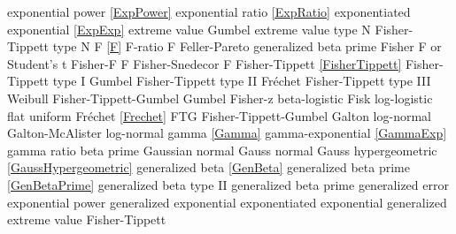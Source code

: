 exponential power				\dotfill	\eqref{ExpPower}					\ncite
exponential ratio				\dotfill	\eqref{ExpRatio}					\ncite	%
exponentiated exponential			\dotfill	\eqref{ExpExp}						\ncite	%
extreme value					\dotfill	Gumbel 							\ncite
extreme value type N 			\dotfill	Fisher-Tippett type N 				\ncite	%
%
F							\dotfill	\eqref{F} 							\ncite	%
F-ratio						\dotfill	F								\ncite	%
Feller-Pareto					\dotfill	generalized beta prime 				\ncite	%
Fisher						\dotfill	F or Student's t 					\ncite	%
Fisher-F 						\dotfill	F 								\ncite	%
Fisher-Snedecor 				\dotfill	F 								\ncite	%
Fisher-Tippett					\dotfill	\eqref{FisherTippett} 					\ncite	%
Fisher-Tippett type I				\dotfill	Gumbel 							\ncite	%
Fisher-Tippett type II				\dotfill	Fr\'{e}chet  						\ncite	%
Fisher-Tippett type III			\dotfill	Weibull 							\ncite	%
Fisher-Tippett-Gumbel			\dotfill	Gumbel  							\ncite	%
Fisher-z						\dotfill	beta-logistic						\ncite	%
Fisk							\dotfill	log-logistic						\ncite 	%
flat 							\dotfill	uniform 							\ncite	%
Fr\'{e}chet 					\dotfill	\eqref{Frechet} 						\ncite	%
FTG							\dotfill	Fisher-Tippett-Gumbel 				\ncite	%
%
Galton						\dotfill	log-normal 						\ncite	%
Galton-McAlister				\dotfill	log-normal 						\ncite	%
gamma						\dotfill	\eqref{Gamma} 					\ncite	%
gamma-exponential				\dotfill	\eqref{GammaExp}					\ncite	%
gamma ratio					\dotfill	beta prime						\ncite	%
Gaussian 						\dotfill	normal 							\ncite	%
Gauss 						\dotfill	normal 							\ncite	%
Gauss hypergeometric			\dotfill	\eqref{GaussHypergeometric}			\ncite
generalized beta 				\dotfill	\eqref{GenBeta} 					\ncite	%
generalized beta prime 			\dotfill	\eqref{GenBetaPrime} 				 %
generalized beta type II			\dotfill	generalized beta prime				
generalized error				\dotfill	exponential power					\ncite
generalized exponential			\dotfill	exponentiated exponential 			    %
generalized extreme value		\dotfill	Fisher-Tippett						\ncite	%
